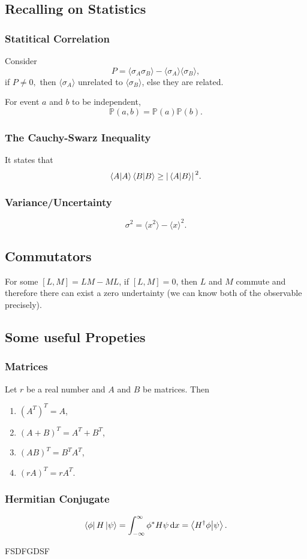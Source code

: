 \documentclass[a4paper]{article}
\begin{document}
\subsection{Recalling on Statistics}
\subsubsection{Statitical Correlation}
Consider 
\[
    P = \langle \sigma_A \sigma_B \rangle - \langle \sigma_A \rangle \langle \sigma_B \rangle,
\]
if $P \neq 0,$ then $\langle \sigma_A \rangle$ unrelated to $\langle \sigma_B \rangle$, else they are related.\\

\par For event $a$ and $b$ to be independent,
\[
    \mathbb{P}(a,b) = \mathbb{P}(a) \mathbb{P}(b).
\]  
\subsubsection{The Cauchy-Swarz Inequality}
It states that 
\[
    \braket{A}{A}\braket{B}{B} \geq \abs*{\braket*{A}{B}}^2.
\]  

\subsubsection{Variance/Uncertainty}
\[
      \sigma^2 = \langle x^2 \rangle - \langle x \rangle^2.
\]
\subsection{Commutators}
For some $[L,M]=LM-ML$, if $[L, M] = 0$, then $L$ and $M$ commute and therefore there can exist a zero undertainty (we can know both of the observable precisely).

\subsection{Some useful Propeties}
\subsubsection{Matrices}
Let $r$ be a real number and $A$ and $B$ be matrices. Then
\begin{enumerate}
    \item $(A^T)^T=A$,
    \item $(A+B)^T=A^T+B^T$,
    \item $(AB)^T=B^T A^T$,
    \item $(rA)^T=rA^T$.
\end{enumerate}

\subsubsection{Hermitian Conjugate}
\[
    \bra{\phi}H\ket{\psi} = \int_{-\infty}^{\infty}\phi^* H \psi \, \mathrm{d}x = \braket{H^\dagger \phi}{\psi}.
\]

FSDFGDSF











\end{document}
